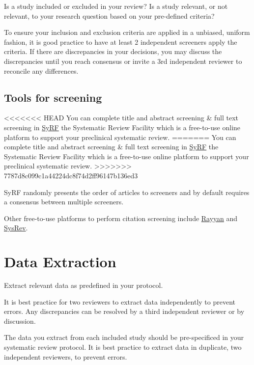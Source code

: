 \documentclass[
]{book}
\begin{document}
Is a study included or excluded in your review? Is a study relevant, or not relevant, to your research question based on your pre-defined criteria?

To ensure your inclusion and exclusion criteria are applied in a unbiased, uniform fashion, it is good practice to have at least 2 independent screeners apply the criteria. If there are discrepancies in your decisions, you may discuss the discrepancies until you reach consensus or invite a 3rd independent reviewer to reconcile any differences.

\hypertarget{tools-for-screening}{%
\section{Tools for screening}\label{tools-for-screening}}

\textless\textless\textless\textless\textless\textless\textless{} HEAD
You can complete title and abstract screening \& full text screening in \href{https://syrf.org.uk/}{SyRF} the Systematic Review Facility which is a free-to-use online platform to support your preclinical systematic review.
=======
You can complete title and abstract screening \& full text screening in \href{http://syrf.org.uk/}{SyRF} the Systematic Review Facility which is a free-to-use online platform to support your preclinical systematic review.
\textgreater\textgreater\textgreater\textgreater\textgreater\textgreater\textgreater{} 7787d8c099c1a44224dc8f74d2ff96147b136ed3

SyRF randomly presents the order of articles to screeners and by default requires a consensus between multiple screeners.

Other free-to-use platforms to perform citation screening include \href{https://rayyan.qcri.org/welcome}{Rayyan} and \href{https://sysrev.com/}{SysRev}.

\hypertarget{data-extraction}{%
\chapter{Data Extraction}\label{data-extraction}}

Extract relevant data as predefined in your protocol.

It is best practice for two reviewers to extract data independently to prevent errors. Any discrepancies can be resolved by a third independent reviewer or by discussion.

The data you extract from each included study should be pre-specificed in your systematic review protocol. It is best practice to extract data in duplicate, two independent reviewers, to prevent errors.
\end{document}
